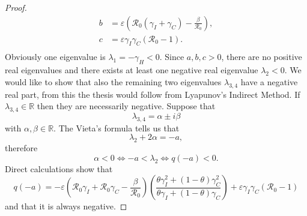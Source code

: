 \documentclass[10pt,a4paper]{amsart}
\begin{document}
\begin{proof}
\begin{equation*}
\begin{split}
        b&=\varepsilon \left( \mathcal{R}_0 (\gamma_I+\gamma_C) - \frac{\beta}{\mathcal{R}_0} \right), \\ 
        c&=\varepsilon \gamma_I \gamma_C (\mathcal{R}_0 - 1).  \\ 
    \end{split}
    \end{equation*}
    Obviously one eigenvalue is $\lambda_1=-\gamma_H < 0$. Since $a,b,c>0$, there are no positive real eigenvalues and there exists at least one negative real eigenvalue $\lambda_2<0$. We would like to show that also the remaining two eigenvalues $\lambda_{3,4}$ have a negative real part, from this the thesis would follow from Lyapunov's Indirect Method. If $\lambda_{3,4} \in \mathbb{R}$ then they are necessarily negative. Suppose that 
    \begin{equation*}
        \lambda_{3,4}=\alpha \pm i \beta 
    \end{equation*} 
    with $\alpha, \beta \in \mathbb{R}$. The Vieta's formula tells us that 
    \begin{equation*}
        \lambda_2 + 2 \alpha = -a, 
    \end{equation*}
    therefore 
    \begin{equation*}
        \alpha < 0 \Longleftrightarrow -a < \lambda_2 \Longleftrightarrow q(-a) < 0. 
    \end{equation*}
    Direct calculations show that 
    \begin{equation*}
        q(-a) = -\varepsilon \left(\mathcal{R}_0 \gamma_I + \mathcal{R}_0 \gamma_C -\frac{\beta}{\mathcal{R}_0}\right) \left(\frac{\theta \gamma_I^2 + (1-\theta)\gamma_C^2}{\theta \gamma_I + (1-\theta)\gamma_C}\right) + \varepsilon \gamma_I \gamma_C (\mathcal{R}_0-1) 
    \end{equation*}
    and that it is always negative. 
\end{proof}
\end{document}
